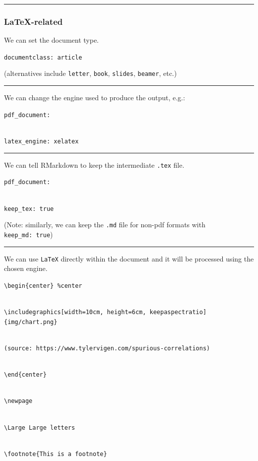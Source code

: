 \documentclass[
  11pt,
]{article}
\begin{document}
\begin{center}\rule{0.5\linewidth}{0.5pt}\end{center}

\hypertarget{latex-related}{%
\subsubsection{LaTeX-related}\label{latex-related}}

We can set the document type.

\texttt{documentclass:\ article}

(alternatives include \texttt{letter}, \texttt{book}, \texttt{slides},
\texttt{beamer}, etc.)

\begin{center}\rule{0.5\linewidth}{0.5pt}\end{center}

We can change the engine used to produce the output, e.g.:

\texttt{pdf\_document:}\strut \\
\texttt{latex\_engine:\ xelatex}

\begin{center}\rule{0.5\linewidth}{0.5pt}\end{center}

We can tell RMarkdown to keep the intermediate \texttt{.tex} file.

\texttt{pdf\_document:}\strut \\
\texttt{keep\_tex:\ true}

(Note: similarly, we can keep the \texttt{.md} file for non-pdf formats
with \texttt{keep\_md:\ true})

\begin{center}\rule{0.5\linewidth}{0.5pt}\end{center}

We can use \texttt{LaTeX} directly within the document and it will be
processed using the chosen engine.

\texttt{\textbackslash{}begin\{center\}\ \%center}\strut \\
\texttt{\textbackslash{}includegraphics{[}width=10cm,\ height=6cm,\ keepaspectratio{]}\{img/chart.png\}}\strut \\
\texttt{(source:\ https://www.tylervigen.com/spurious-correlations)}\strut \\
\texttt{\textbackslash{}end\{center\}}\strut \\
\texttt{\textbackslash{}newpage}\strut \\
\texttt{\textbackslash{}Large\ Large\ letters}\strut \\
\texttt{\textbackslash{}footnote\{This\ is\ a\ footnote\}}
\end{document}
